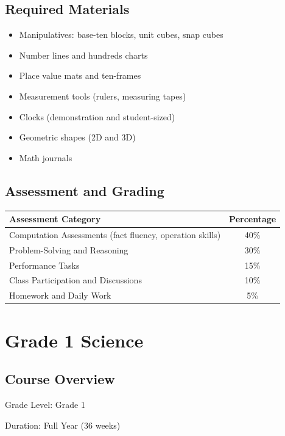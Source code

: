 \documentclass[11pt,letterpaper]{report}
\begin{document}
\section{Required Materials}

\begin{itemize}
    \item Manipulatives: base-ten blocks, unit cubes, snap cubes
    \item Number lines and hundreds charts
    \item Place value mats and ten-frames
    \item Measurement tools (rulers, measuring tapes)
    \item Clocks (demonstration and student-sized)
    \item Geometric shapes (2D and 3D)
    \item Math journals
\end{itemize}

\section{Assessment and Grading}

\begin{center}
\begin{tabular}{|l|c|}
\hline
\textbf{Assessment Category} & \textbf{Percentage} \\
\hline
Computation Assessments (fact fluency, operation skills) & 40\% \\
\hline
Problem-Solving and Reasoning & 30\% \\
\hline
Performance Tasks & 15\% \\
\hline
Class Participation and Discussions & 10\% \\
\hline
Homework and Daily Work & 5\% \\
\hline
\end{tabular}
\end{center}

\chapter{Grade 1 Science}

\section{Course Overview}

Grade Level: Grade 1

Duration: Full Year (36 weeks)
\end{document}
